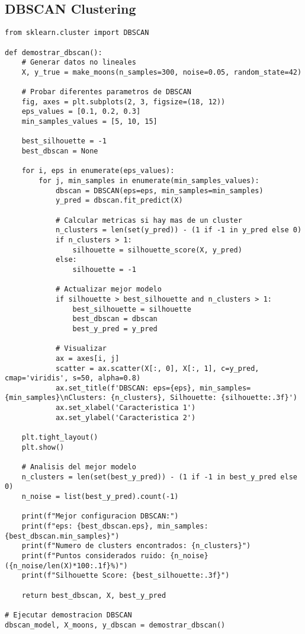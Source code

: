 \documentclass[12pt]{article}
\begin{document}
\subsection{DBSCAN Clustering}

\begin{lstlisting}
from sklearn.cluster import DBSCAN

def demostrar_dbscan():
    # Generar datos no lineales
    X, y_true = make_moons(n_samples=300, noise=0.05, random_state=42)
    
    # Probar diferentes parametros de DBSCAN
    fig, axes = plt.subplots(2, 3, figsize=(18, 12))
    eps_values = [0.1, 0.2, 0.3]
    min_samples_values = [5, 10, 15]
    
    best_silhouette = -1
    best_dbscan = None
    
    for i, eps in enumerate(eps_values):
        for j, min_samples in enumerate(min_samples_values):
            dbscan = DBSCAN(eps=eps, min_samples=min_samples)
            y_pred = dbscan.fit_predict(X)
            
            # Calcular metricas si hay mas de un cluster
            n_clusters = len(set(y_pred)) - (1 if -1 in y_pred else 0)
            if n_clusters > 1:
                silhouette = silhouette_score(X, y_pred)
            else:
                silhouette = -1
                
            # Actualizar mejor modelo
            if silhouette > best_silhouette and n_clusters > 1:
                best_silhouette = silhouette
                best_dbscan = dbscan
                best_y_pred = y_pred
            
            # Visualizar
            ax = axes[i, j]
            scatter = ax.scatter(X[:, 0], X[:, 1], c=y_pred, cmap='viridis', s=50, alpha=0.8)
            ax.set_title(f'DBSCAN: eps={eps}, min_samples={min_samples}\nClusters: {n_clusters}, Silhouette: {silhouette:.3f}')
            ax.set_xlabel('Caracteristica 1')
            ax.set_ylabel('Caracteristica 2')
    
    plt.tight_layout()
    plt.show()
    
    # Analisis del mejor modelo
    n_clusters = len(set(best_y_pred)) - (1 if -1 in best_y_pred else 0)
    n_noise = list(best_y_pred).count(-1)
    
    print(f"Mejor configuracion DBSCAN:")
    print(f"eps: {best_dbscan.eps}, min_samples: {best_dbscan.min_samples}")
    print(f"Numero de clusters encontrados: {n_clusters}")
    print(f"Puntos considerados ruido: {n_noise} ({n_noise/len(X)*100:.1f}%)")
    print(f"Silhouette Score: {best_silhouette:.3f}")
    
    return best_dbscan, X, best_y_pred

# Ejecutar demostracion DBSCAN
dbscan_model, X_moons, y_dbscan = demostrar_dbscan()
\end{lstlisting}
\end{document}
